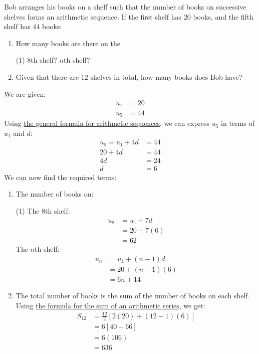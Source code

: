 \newpage
\begin{exercise}[Easy]
	Bob arranges his books on a shelf such that the number of books on successive shelves forms an arithmetic sequence. If the first shelf has 20 books,
	and the fifth shelf has 44 books:
	\begin{enumerate}[label=(\alph*)]
		\item How many books are there on the
		\begin{tasks}[label=(\roman*)](1)
			\task 8th shelf?
			\task $n$th shelf?
		\end{tasks}
		\item Given that there are 12 shelves in total, how many books does Bob have?
	\end{enumerate}
\end{exercise}
\begin{answer}
	We are given:
	\begin{align*}
		u_1 &= 20 \\
		u_5 &= 44
	\end{align*}
	Using \hyperref[prop:arithmetic-general-formula]{the general formula for arithmetic sequences}, we can express $u_5$ in terms of $u_1$ and $d$:
	\begin{align*}
		u_5 = u_1 + 4d &= 44 \\
		20 + 4d &= 44 \\
		4d &= 24 \\
		d &= 6
	\end{align*}
	We can now find the required terms:
	\begin{enumerate}[label=(\alph*)]
		\item The number of books on:
		\begin{tasks}[label=(\roman*)](1)
			\task The 8th shelf:
			\begin{align*}
				u_8 &= u_1 + 7d \\
				&= 20 + 7(6) \\
				&= 62
			\end{align*}
			\task The $n$th shelf:
			\begin{align*}
				u_n &= u_1 + (n-1)d \\
				&= 20 + (n-1)(6) \\
				&= 6n + 14
			\end{align*}
		\end{tasks}
		\vspace{-20pt}
		\item The total number of books is the sum of the number of books on each shelf. Using \hyperref[prop:arithmetic-series-sum]{the formula for the sum of an arithmetic series}, we get:
		\begin{align*}
			S_{12} &= \frac{12}{2}[2(20) + (12-1)(6)] \\
			&= 6[40 + 66] \\
			&= 6(106) \\
			&= 636
		\end{align*}
	\end{enumerate}
\end{answer}

